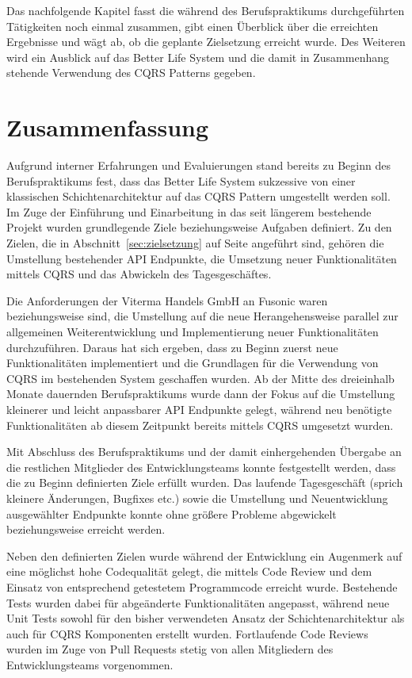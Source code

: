 \documentclass[a4paper,12pt,twoside]{scrreprt}
\begin{document}
Das nachfolgende Kapitel fasst die während des Berufspraktikums durchgeführten Tätigkeiten noch einmal zusammen, gibt einen Überblick über die erreichten Ergebnisse und wägt ab, ob die geplante Zielsetzung erreicht wurde. Des Weiteren wird ein Ausblick auf das Better Life System und die damit in Zusammenhang stehende Verwendung des CQRS Patterns gegeben.

\section{Zusammenfassung}
\label{sec:zusammenfassung}
Aufgrund interner Erfahrungen und Evaluierungen stand bereits zu Beginn des Berufspraktikums fest, dass das Better Life System sukzessive von einer klassischen Schichtenarchitektur auf das CQRS Pattern umgestellt werden soll. Im Zuge der Einführung und Einarbeitung in das seit längerem bestehende Projekt wurden grundlegende Ziele beziehungsweise Aufgaben definiert. Zu den Zielen, die in Abschnitt~\ref{sec:zielsetzung} auf Seite \pageref{sec:zielsetzung} angeführt sind, gehören die Umstellung bestehender API Endpunkte, die Umsetzung neuer Funktionalitäten mittels CQRS und das Abwickeln des Tagesgeschäftes.

\medskip

Die Anforderungen der Viterma Handels GmbH an Fusonic waren beziehungsweise sind, die Umstellung auf die neue Herangehensweise parallel zur allgemeinen Weiterentwicklung und Implementierung neuer Funktionalitäten durchzuführen. Daraus hat sich ergeben, dass zu Beginn zuerst neue Funktionalitäten implementiert und die Grundlagen für die Verwendung von CQRS im bestehenden System geschaffen wurden. Ab der Mitte des dreieinhalb Monate dauernden Berufspraktikums wurde dann der Fokus auf die Umstellung kleinerer und leicht anpassbarer API Endpunkte gelegt, während neu benötigte Funktionalitäten ab diesem Zeitpunkt bereits mittels CQRS umgesetzt wurden.

Mit Abschluss des Berufspraktikums und der damit einhergehenden Übergabe an die restlichen Mitglieder des Entwicklungsteams konnte festgestellt werden, dass die zu Beginn definierten Ziele erfüllt wurden. Das laufende Tagesgeschäft (sprich kleinere Änderungen, Bugfixes etc.) sowie die Umstellung und Neuentwicklung ausgewählter Endpunkte konnte ohne größere Probleme abgewickelt beziehungsweise erreicht werden.

\medskip

Neben den definierten Zielen wurde während der Entwicklung ein Augenmerk auf eine möglichst hohe Codequalität gelegt, die mittels Code Review und dem Einsatz von entsprechend getestetem Programmcode erreicht wurde. Bestehende Tests wurden dabei für abgeänderte Funktionalitäten angepasst, während neue Unit Tests sowohl für den bisher verwendeten Ansatz der Schichtenarchitektur als auch für CQRS Komponenten erstellt wurden. Fortlaufende Code Reviews wurden im Zuge von Pull Requests stetig von allen Mitgliedern des Entwicklungsteams vorgenommen.
\end{document}
